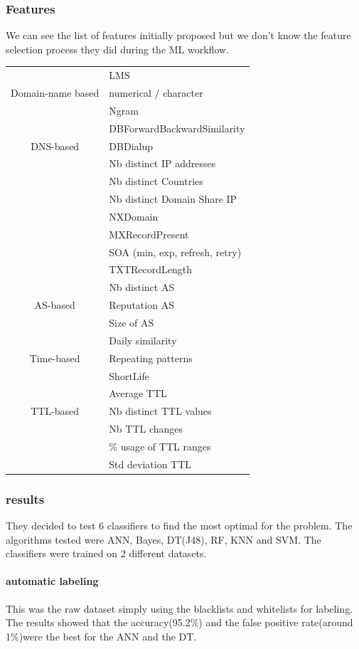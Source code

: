 \subsubsection{Features}
We can see the list of features initially proposed but we don't know the feature selection process they did during the ML workflow. 
\begin{tabular}{c|l}
\hline
 & LMS\\
Domain-name based & numerical / character\\
& Ngram\\
\hline
 & DBForwardBackwardSimilarity\\
DNS-based & DBDialup\\
& Nb distinct IP addresses\\
& Nb distinct Countries\\
& Nb distinct Domain Share IP\\
& NXDomain\\
& MXRecordPresent\\
& SOA (min, exp, refresh, retry)\\
& TXTRecordLength\\
\hline
 & Nb distinct AS\\
AS-based & Reputation AS\\
& Size of AS\\
\hline
 & Daily similarity\\
Time-based & Repeating patterns\\
& ShortLife\\
\hline
 & Average TTL\\
TTL-based & Nb distinct TTL values\\
& Nb TTL changes\\
& \% usage of TTL ranges\\
& Std deviation TTL\\
\end{tabular}

\subsubsection{results}
They decided to test 6 classifiers to find the most optimal for the problem. The algorithms tested were ANN, Bayes, DT(J48), RF, KNN and SVM. The classifiers were trained on 2 different datasets. 
\paragraph{automatic labeling}
This was the raw dataset simply using the blacklists and whitelists for labeling. The results showed that the accuracy(95.2\%) and the false positive rate(around 1\%)were the best for the ANN and the DT.
